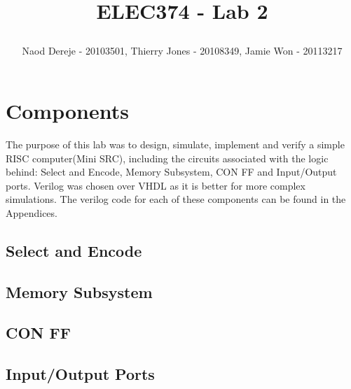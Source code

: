 \documentclass{article}
\title{
    \begin{large}
        ELEC374 - Lab 2
    \end{large}
}
\author{Naod Dereje - 20103501, Thierry Jones - 20108349, Jamie Won - 20113217}
\begin{document}
\maketitle
\cleardoublepage
\tableofcontents
\cleardoublepage


\section{Components}
    The purpose of this lab was to design, simulate, implement and verify a simple RISC computer(Mini SRC), including the circuits associated with the logic behind: 
    Select and Encode, Memory Subsystem, CON FF and Input/Output ports. Verilog was chosen over VHDL as it is better for more complex simulations. The verilog code 
    for each of these components can be found in the Appendices.
    
    \subsection{Select and Encode}


    \subsection{Memory Subsystem}
    

    \subsection{CON FF}
    

    \subsection{Input/Output Ports}
\end{document}
